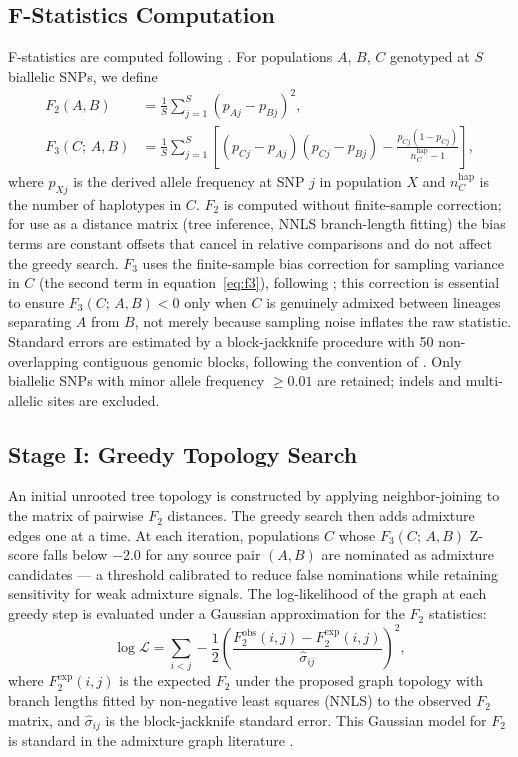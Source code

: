 \subsection*{F-Statistics Computation}

F-statistics are computed following \citet{Patterson2012}.
For populations $A$, $B$, $C$ genotyped at $S$ biallelic SNPs, we define
\begin{align}
  F_2(A,B) &= \frac{1}{S}\sum_{j=1}^{S}(p_{Aj} - p_{Bj})^2, \label{eq:f2}\\
  F_3(C;\,A,B) &= \frac{1}{S}\sum_{j=1}^{S}
    \left[(p_{Cj} - p_{Aj})(p_{Cj} - p_{Bj})
          - \frac{p_{Cj}(1-p_{Cj})}{n_C^{\mathrm{hap}} - 1}\right], \label{eq:f3}
\end{align}
where $p_{Xj}$ is the derived allele frequency at SNP $j$ in population $X$
and $n_C^{\mathrm{hap}}$ is the number of haplotypes in $C$.
$F_2$ is computed without finite-sample correction; for use as a distance
matrix (tree inference, NNLS branch-length fitting) the bias terms are
constant offsets that cancel in relative comparisons and do not affect
the greedy search.
$F_3$ uses the finite-sample bias correction for sampling variance in $C$
(the second term in equation~\ref{eq:f3}), following \citet{Patterson2012};
this correction is essential to ensure $F_3(C;\,A,B) < 0$ only when $C$
is genuinely admixed between lineages separating $A$ from $B$, not merely
because sampling noise inflates the raw statistic.
Standard errors are estimated by a block-jackknife procedure with 50
non-overlapping contiguous genomic blocks, following the convention of
\citet{Reich2009}.
Only biallelic SNPs with minor allele frequency $\geq 0.01$ are retained;
indels and multi-allelic sites are excluded.

\subsection*{Stage I: Greedy Topology Search}

An initial unrooted tree topology is constructed by applying neighbor-joining
\citep{SaitouNei1987} to the matrix of pairwise $F_2$ distances.
The greedy search then adds admixture edges one at a time.
At each iteration, populations $C$ whose $F_3(C;\,A,B)$ Z-score falls below
$-2.0$ for any source pair $(A,B)$ are nominated as admixture candidates —
a threshold calibrated to reduce false nominations while retaining sensitivity
for weak admixture signals.
The log-likelihood of the graph at each greedy step is evaluated under a
Gaussian approximation for the $F_2$ statistics:
\begin{equation}
  \log \mathcal{L} = \sum_{i<j} -\frac{1}{2}
    \left(\frac{F_2^{\mathrm{obs}}(i,j) - F_2^{\mathrm{exp}}(i,j)}
               {\hat{\sigma}_{ij}}\right)^{\!2},
  \label{eq:f2_ll}
\end{equation}
where $F_2^{\mathrm{exp}}(i,j)$ is the expected $F_2$ under the proposed graph
topology with branch lengths fitted by non-negative least squares (NNLS)
to the observed $F_2$ matrix, and $\hat{\sigma}_{ij}$ is the block-jackknife
standard error.
This Gaussian model for $F_2$ is standard in the admixture graph literature
\citep{Pickrell2012,Patterson2012}.

